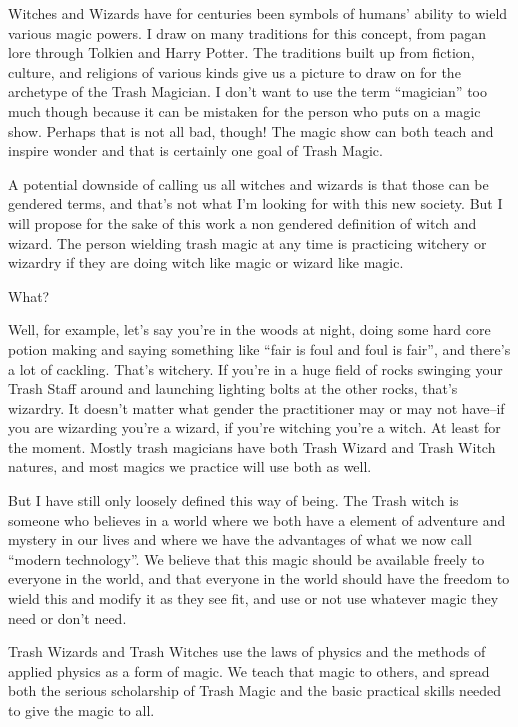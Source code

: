 Witches and Wizards have for centuries been symbols of humans' ability
to wield various magic powers. I draw on many traditions for this
concept, from pagan lore through Tolkien and Harry Potter. The
traditions built up from fiction, culture, and religions of various
kinds give us a picture to draw on for the archetype of the Trash
Magician. I don't want to use the term ``magician'' too much though
because it can be mistaken for the person who puts on a magic show.
Perhaps that is not all bad, though! The magic show can both teach and
inspire wonder and that is certainly one goal of Trash Magic.

A potential downside of calling us all witches and wizards is that those
can be gendered terms, and that's not what I'm looking for with this new
society. But I will propose for the sake of this work a non gendered
definition of witch and wizard. The person wielding trash magic at any
time is practicing witchery or wizardry if they are doing witch like
magic or wizard like magic.

What?

Well, for example, let's say you're in the woods at night, doing some
hard core potion making and saying something like ``fair is foul and
foul is fair'', and there's a lot of cackling. That's witchery. If
you're in a huge field of rocks swinging your Trash Staff around and
launching lighting bolts at the other rocks, that's wizardry. It doesn't
matter what gender the practitioner may or may not have--if you are
wizarding you're a wizard, if you're witching you're a witch. At least
for the moment. Mostly trash magicians have both Trash Wizard and Trash
Witch natures, and most magics we practice will use both as well.

But I have still only loosely defined this way of being. The Trash witch
is someone who believes in a world where we both have a element of
adventure and mystery in our lives and where we have the advantages of
what we now call ``modern technology''. We believe that this magic
should be available freely to everyone in the world, and that everyone
in the world should have the freedom to wield this and modify it as they
see fit, and use or not use whatever magic they need or don't need.

Trash Wizards and Trash Witches use the laws of physics and the methods
of applied physics as a form of magic. We teach that magic to others,
and spread both the serious scholarship of Trash Magic and the basic
practical skills needed to give the magic to all.

